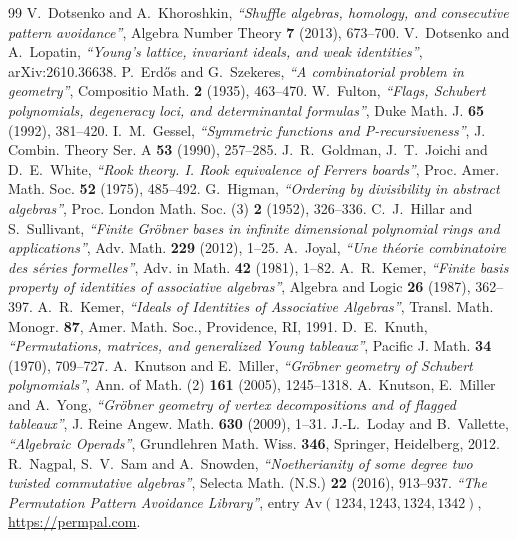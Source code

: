 \documentclass[11pt]{amsart}
\theoremstyle{definition}
\theoremstyle{remark}
\newcommand{\Av}{\mathrm{Av}}
\begin{document}
\begin{thebibliography}{99}
 V.~Dotsenko and A.~Khoroshkin, \textit{``Shuffle algebras, homology, and consecutive pattern avoidance''}, Algebra Number Theory \textbf{7} (2013), 673--700.
 V.~Dotsenko and A.~Lopatin, \textit{``Young's lattice, invariant ideals, and weak identities''}, arXiv:2610.36638.
 P.~Erd\H{o}s and G.~Szekeres, \textit{``A combinatorial problem in geometry''}, Compositio Math. \textbf{2} (1935), 463--470.
 W.~Fulton, \textit{``Flags, Schubert polynomials, degeneracy loci, and determinantal formulas''}, Duke Math. J. \textbf{65} (1992), 381--420.
 I.~M.~Gessel, \textit{``Symmetric functions and P-recursiveness''}, J. Combin. Theory Ser. A \textbf{53} (1990), 257--285.
 J.~R.~Goldman, J.~T.~Joichi and D.~E.~White, \textit{``Rook theory. I. Rook equivalence of Ferrers boards''}, Proc. Amer. Math. Soc. \textbf{52} (1975), 485--492.
 G.~Higman, \textit{``Ordering by divisibility in abstract algebras''}, Proc. London Math. Soc. (3) \textbf{2} (1952), 326--336.
 C.~J.~Hillar and S.~Sullivant, \textit{``Finite Gr\"obner bases in infinite dimensional polynomial rings and applications''}, Adv. Math. \textbf{229} (2012), 1--25.
 A.~Joyal, \textit{``Une th\'eorie combinatoire des s\'eries formelles''}, Adv. in Math. \textbf{42} (1981), 1--82.
 A.~R.~Kemer, \textit{``Finite basis property of identities of associative algebras''}, Algebra and Logic \textbf{26} (1987), 362--397.
 A.~R.~Kemer, \textit{``Ideals of Identities of Associative Algebras''}, Transl. Math. Monogr. \textbf{87}, Amer. Math. Soc., Providence, RI, 1991.
 D.~E.~Knuth, \textit{``Permutations, matrices, and generalized Young tableaux''}, Pacific J. Math. \textbf{34} (1970), 709--727.
 A.~Knutson and E.~Miller, \textit{``Gr\"obner geometry of Schubert polynomials''}, Ann. of Math. (2) \textbf{161} (2005), 1245--1318.
 A.~Knutson, E.~Miller and A.~Yong, \textit{``Gr\"obner geometry of vertex decompositions and of flagged tableaux''}, J. Reine Angew. Math. \textbf{630} (2009), 1--31.
 J.-L.~Loday and B.~Vallette, \textit{``Algebraic Operads''}, Grundlehren Math. Wiss. \textbf{346}, Springer, Heidelberg, 2012.
 R.~Nagpal, S.~V.~Sam and A.~Snowden, \textit{``Noetherianity of some degree two twisted commutative algebras''}, Selecta Math. (N.S.) \textbf{22} (2016), 913--937.
 \textit{``The Permutation Pattern Avoidance Library''}, entry $\Av(1234,1243,1324,1342)$, \url{https://permpal.com}.

\end{thebibliography}
\end{document}
